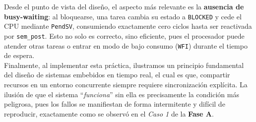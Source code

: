 \documentclass[12pt,letterpaper]{article}
\begin{document}
\noindent
Desde el punto de vista del diseño, el aspecto más relevante es la \textbf{ausencia de busy-waiting}: al bloquearse, una tarea cambia su estado a \texttt{BLOCKED} y cede el CPU mediante \texttt{PendSV}, consumiendo exactamente cero ciclos hasta ser reactivada por \texttt{sem\_post}. Esto no solo es correcto, sino eficiente, pues el procesador puede atender otras tareas o entrar en modo de bajo consumo (\texttt{WFI}) durante el tiempo de espera.\\

Finalmente, al implementar esta práctica, ilustramos un principio fundamental del diseño de sistemas embebidos en tiempo real, el cual es que, compartir recursos en un entorno concurrente siempre requiere sincronización explícita. La ilusión de que el sistema ``\textit{funciona}'' sin ella es precisamente la condición más peligrosa, pues los fallos se manifiestan de forma intermitente y difícil de reproducir, exactamente como se observó en el \textit{Caso 1} de la \textbf{Fase A}.
 
\end{document}
